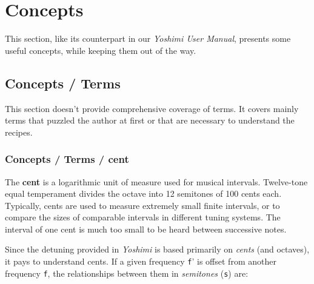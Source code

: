 %
%
%

\section{Concepts}
\label{sec:concepts}

   This section, like its counterpart in our \textsl{Yoshimi User Manual},
   presents some useful concepts, while keeping them out of the way.

\subsection{Concepts / Terms}
\label{subsec:concepts_terms}

   This section doesn't provide comprehensive coverage of terms.  It
   covers mainly terms that puzzled the author at first or that are
   necessary to understand the recipes.

\subsubsection{Concepts / Terms / cent}
\label{subsubsec:concepts_terms_cent}

   The \textbf{cent}
   is a logarithmic unit of measure used for musical
   intervals.  Twelve-tone equal temperament divides the octave into 12
   semitones of 100 cents each. Typically, cents are used to measure
   extremely small finite intervals, or to compare the sizes of comparable
   intervals in different tuning systems.
   The interval of one cent is much too small to be heard between
   successive notes.

   Since the detuning provided in \textsl{Yoshimi} is based primarily on
   \textsl{cents} (and octaves), it pays to understand cents.  If a given
   frequency \texttt{f}' is offset from another frequency \texttt{f}, the
   relationships between them in \textsl{semitones} (\texttt{s}) are:

